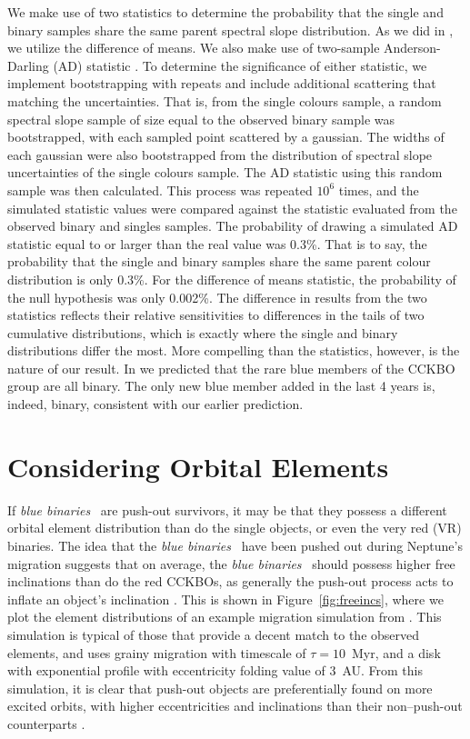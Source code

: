 \documentclass[twocolumn]{aastex63}
\newcommand{\bluebinaries}{{\it blue binaries}}
\begin{document}
We make use of two statistics to determine the probability that the single and binary samples share the same parent spectral slope distribution. As we did in \citet{Fraser2017}, we utilize the difference of means. We also make use of two-sample Anderson-Darling (AD) statistic \citep{Anderson1952,Efron1979,Scholz1987}. To determine the significance of either statistic, we implement bootstrapping with repeats and include additional scattering that matching the uncertainties. That is, from the single colours sample, a random spectral slope sample of size equal to the observed binary sample was bootstrapped, with each sampled point scattered by a gaussian. The widths of each gaussian were also bootstrapped from the distribution of spectral slope uncertainties of the single colours sample. The AD statistic using this random sample was then calculated. This process was repeated $10^6$ times, and the simulated statistic values were compared against the statistic evaluated from the observed binary and singles samples. The probability of drawing a simulated AD statistic equal to or larger than the real value was 0.3\%. That is to say, the probability that the single and binary samples share the same parent colour distribution is only 0.3\%. For the difference of means statistic, the probability of the null hypothesis was only 0.002\%. The difference in results from the two statistics reflects their relative sensitivities to differences in the tails of two cumulative distributions, which is exactly where the single and binary distributions differ the most. More compelling than the statistics, however, is the nature of our result.  In \citet{Fraser2017} we predicted that the rare blue members of the CCKBO group are all binary. The only new blue member added in the last 4 years is, indeed, binary, consistent with our earlier prediction.

\section{Considering Orbital Elements}

If  \bluebinaries~ are push-out survivors, it may be that they possess a different orbital element distribution than do the single objects, or even the very red (VR) binaries. The idea that the \bluebinaries~ have been pushed out during Neptune's migration suggests that on average, the \bluebinaries~ should possess higher free inclinations than do the red CCKBOs, as generally the push-out process acts to inflate an object's inclination \citep{Malhotra1993,Hahn2005,Nesvorny2015b}. This is shown in Figure~\ref{fig:freeincs}, where we plot the element distributions of an example migration simulation from \citet{Nesvorny2015a}. This simulation is typical of those that provide a decent match to the observed elements, and uses grainy migration with timescale of $\tau=10$~Myr, and a disk with exponential profile with eccentricity folding value of $3$~AU. From this simulation, it is clear that push-out objects are preferentially found on more excited orbits, with higher eccentricities and inclinations than their non--push-out counterparts \citep[also, see][]{Fraser2017}.
\end{document}
